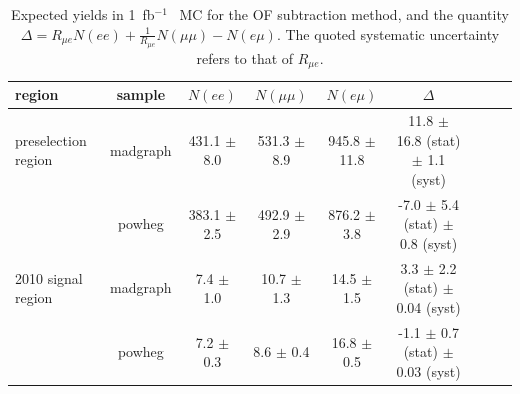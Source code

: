 \begin{table}[hbt]
\begin{center}
\caption{\label{tab:mcof} Expected yields in 1~fb$^{-1}$ \ttbar\ MC for the OF subtraction method,
and the quantity $\Delta = R_{\mu e}N(ee) + \frac{1}{R_{\mu e}}N(\mu\mu) - N(e\mu)$. 
The quoted systematic uncertainty refers to that of $R_{\mu e}$.
}
\begin{tabular}{lcccccccc}
\hline
region                  &     sample  &       $N(ee)$     &      $N(\mu\mu)$   &     $N(e\mu)$      &         $\Delta$   \\ 
\hline

\hline

preselection region     &   madgraph  & 431.1 $\pm$ 8.0   &  531.3 $\pm$ 8.9   &  945.8 $\pm$ 11.8  &  11.8 $\pm$ 16.8 (stat) $\pm$ 1.1 (syst)   \\
                        &   powheg    & 383.1 $\pm$ 2.5   &  492.9 $\pm$ 2.9   &  876.2 $\pm$ 3.8   &  -7.0 $\pm$  5.4 (stat) $\pm$ 0.8 (syst)   \\

\hline

2010 signal region      &   madgraph  &   7.4 $\pm$ 1.0   &   10.7 $\pm$ 1.3   &   14.5 $\pm$ 1.5   &   3.3 $\pm$  2.2 (stat) $\pm$  0.04 (syst) \\
                        &   powheg    &   7.2 $\pm$ 0.3   &    8.6 $\pm$ 0.4   &   16.8 $\pm$ 0.5   &  -1.1 $\pm$  0.7 (stat) $\pm$  0.03 (syst) \\

\hline

\hline
\end{tabular}
\end{center}
\end{table}

